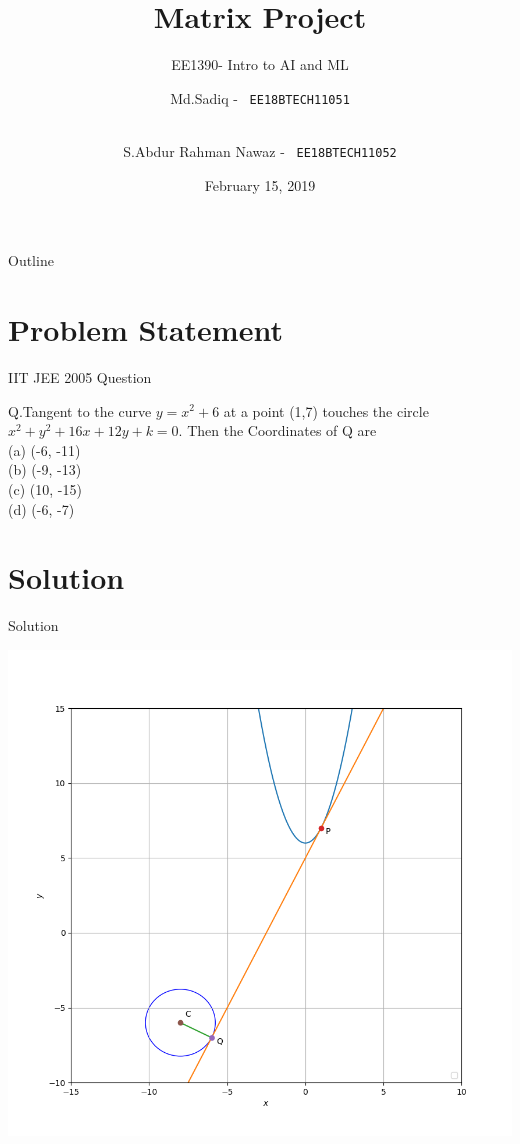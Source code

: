\documentclass{beamer}
\title{Matrix Project}
\subtitle{EE1390- Intro to AI and ML}
\author{
Md.Sadiq -  \
\texttt{EE18BTECH11051}
\and \\
S.Abdur Rahman Nawaz -  \
\texttt{EE18BTECH11052}
}
\institute{IIT HYDERABAD}
\date{February 15, 2019}
\begin{document}
\begin{frame}
  \titlepage
\end{frame}

\begin{frame}{Outline}
  \tableofcontents
\end{frame}

\section{Problem Statement}

\begin{frame}{IIT JEE 2005 Question}
 
 
   Q.Tangent to the curve $y = x^2 + 6$ at a point (1,7) touches the circle $x^2 + y^2 + 16x + 12y + k = 0$. Then the Coordinates of Q are \\
  (a) (-6, -11)\\
  (b) (-9, -13)\\
  (c) (10, -15)\\
  (d) (-6, -7)\\
\end{frame}

\section{Solution}

\begin{frame}{Solution}

\begin{center}
    \includegraphics[scale =0.35]{Fig1.png}
\end{center}



\end{frame}
\end{document}
